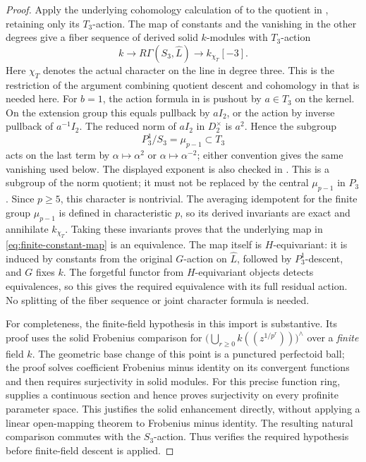\begin{proof}
Apply the underlying cohomology calculation of
\cite[Proposition~3.6.9]{BMR2026} to the quotient in ,
retaining only its $T_3$-action.  The map of constants and the vanishing
in the other degrees give a fiber sequence of derived solid $k$-modules
with $T_3$-action
\[
 k\longrightarrow R\Gamma(S_3,\widehat L)
   \longrightarrow k_{\chi_T}[-3].
\]
Here $\chi_T$ denotes the actual character on the line in degree three.
This is the restriction of the argument combining quotient descent and cohomology in
\cite[Theorem~3.6.10]{BMR2026} that is needed here.  For $b=1$, the action
formula in  is pushout by $a\in T_3$ on the kernel.
On the extension group this equals pullback by $aI_2$, or the
action by inverse pullback of $a^{-1}I_2$.  The reduced norm of $aI_2$
in $D_2^\times$ is $a^2$.  Hence the subgroup
\[
 P_3^1/S_3=\mu_{p-1}\subset T_3
\]
acts on the last term by $\alpha\mapsto\alpha^{2}$ or
$\alpha\mapsto\alpha^{-2}$; either convention gives the same vanishing
used below.  The displayed exponent is also checked in
\cite[Lemma 5.2.5]{BMR2026}.  This is a subgroup of the norm quotient;
it must not be replaced by the central $\mu_{p-1}$ in $P_3$.
Since $p\ge5$, this character is nontrivial.  The averaging idempotent
for the finite group $\mu_{p-1}$ is defined in characteristic $p$, so its
derived invariants are exact and annihilate $k_{\chi_T}$.
Taking these invariants proves that the underlying map in
\eqref{eq:finite-constant-map} is an equivalence.  The map itself is
$H$-equivariant: it is induced by constants from the original $G$-action
on $\widehat L$, followed by $P_3^1$-descent, and $G$ fixes $k$.
The forgetful functor from $H$-equivariant objects detects equivalences,
so this gives the required equivalence with its full residual action.
No splitting of the fiber sequence or joint character formula is needed.

For completeness, the finite-field hypothesis in this import is
substantive.  Its proof uses the solid Frobenius comparison
\cite[Lemma 3.6.3 and Corollary 3.6.8]{BMR2026} for
$\bigl(\bigcup_{r\ge0}k((z^{1/p^r}))\bigr)^{\wedge}$
over a \emph{finite} field $k$.
The geometric base change of this point is a punctured perfectoid ball;
the proof solves coefficient Frobenius minus identity on its convergent functions
and then requires surjectivity in solid modules.  For this precise
function ring,  supplies a continuous
section and hence proves surjectivity on every profinite parameter space.
This justifies the solid enhancement directly, without applying a
linear open-mapping theorem to Frobenius minus identity.  The resulting natural
comparison commutes with the $S_3$-action.  Thus
 verifies the required hypothesis before finite-field
descent is applied.


\end{proof}
